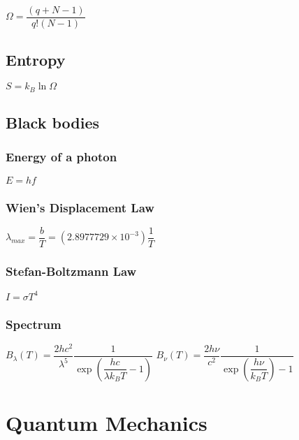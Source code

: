 \begin{itemize}
\itemt \( \Omega = \dfrac{(q+N-1)}{q!(N-1)} \)
\end{itemize}

\subsection{Entropy}

\begin{itemize}
\itemt \( S = k_B \ln \Omega \)
\end{itemize}


\subsection{Black bodies}

\subsubsection{Energy of a photon}
\begin{itemize}
\itemt \( E = hf \)
\end{itemize}

\subsubsection{Wien's Displacement Law}
\begin{itemize}
\itemt \( \lambda_{max} = \dfrac{b}{T} = (2.8977729\times10^{-3}) \dfrac{1}{T} \)
\end{itemize}

\subsubsection{Stefan-Boltzmann Law}
\begin{itemize}
\itemt \( I = \sigma T^4 \)
\end{itemize}

\subsubsection{Spectrum}
\begin{itemize}
\itemt \( B_\lambda (T) = \dfrac{2 h c^2}{\lambda^5} \dfrac{1}{\exp(\dfrac{h c}{\lambda k_B T} - 1)} \)
\itemt \( B_\nu (T) = \dfrac{2 h \nu}{c^2} \dfrac{1}{\exp(\dfrac{h \nu}{k_B T}) - 1} \)
\end{itemize}

	\section{Quantum Mechanics}	

